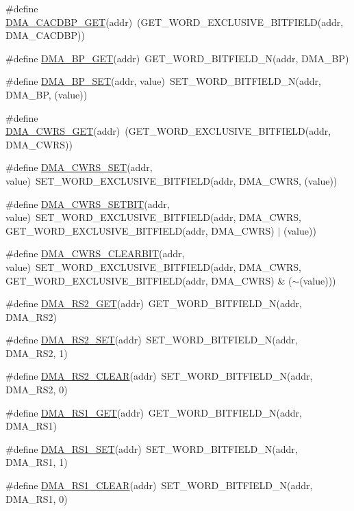 \begin{DoxyCompactItemize}
\#define \hyperlink{a00548_a85feec50364f750c4544956b6958073d}{DMA\_\-CACDBP\_\-GET}(addr)~(GET\_\-WORD\_\-EXCLUSIVE\_\-BITFIELD(addr, DMA\_\-CACDBP))
\item 
\#define \hyperlink{a00548_a220b0aabe103f3c9f9b391748a2f8770}{DMA\_\-BP\_\-GET}(addr)~GET\_\-WORD\_\-BITFIELD\_\-N(addr, DMA\_\-BP)
\item 
\#define \hyperlink{a00548_ac3ec9d44e2d1359fc7e25a35b9ccc60d}{DMA\_\-BP\_\-SET}(addr, value)~SET\_\-WORD\_\-BITFIELD\_\-N(addr, DMA\_\-BP, (value))
\item 
\#define \hyperlink{a00548_aa1af6663d5da77c5b8c5075ef603cf6e}{DMA\_\-CWRS\_\-GET}(addr)~(GET\_\-WORD\_\-EXCLUSIVE\_\-BITFIELD(addr, DMA\_\-CWRS))
\item 
\#define \hyperlink{a00548_a131e5865c587b465550343b69eeaabd5}{DMA\_\-CWRS\_\-SET}(addr, value)~SET\_\-WORD\_\-EXCLUSIVE\_\-BITFIELD(addr, DMA\_\-CWRS, (value))
\item 
\#define \hyperlink{a00548_a122f3d891cc104f1f3572648359c4637}{DMA\_\-CWRS\_\-SETBIT}(addr, value)~SET\_\-WORD\_\-EXCLUSIVE\_\-BITFIELD(addr, DMA\_\-CWRS, GET\_\-WORD\_\-EXCLUSIVE\_\-BITFIELD(addr, DMA\_\-CWRS) $|$ (value))
\item 
\#define \hyperlink{a00548_abfa6eead7bfc7a1844e6d3518c48dac8}{DMA\_\-CWRS\_\-CLEARBIT}(addr, value)~SET\_\-WORD\_\-EXCLUSIVE\_\-BITFIELD(addr, DMA\_\-CWRS, GET\_\-WORD\_\-EXCLUSIVE\_\-BITFIELD(addr, DMA\_\-CWRS) \& ($\sim$(value)))
\item 
\#define \hyperlink{a00548_a80c2ed408c1d84abcc8cd48b1ea47a76}{DMA\_\-RS2\_\-GET}(addr)~GET\_\-WORD\_\-BITFIELD\_\-N(addr, DMA\_\-RS2)
\item 
\#define \hyperlink{a00548_a3c74db6964b09cf9d719e23e0b6f418d}{DMA\_\-RS2\_\-SET}(addr)~SET\_\-WORD\_\-BITFIELD\_\-N(addr, DMA\_\-RS2, 1)
\item 
\#define \hyperlink{a00548_a56cf33a3ff47843e93b59f3c9215c190}{DMA\_\-RS2\_\-CLEAR}(addr)~SET\_\-WORD\_\-BITFIELD\_\-N(addr, DMA\_\-RS2, 0)
\item 
\#define \hyperlink{a00548_a243abce1dd03462aa4c984c6b6aed39a}{DMA\_\-RS1\_\-GET}(addr)~GET\_\-WORD\_\-BITFIELD\_\-N(addr, DMA\_\-RS1)
\item 
\#define \hyperlink{a00548_a58d011526951b33ac0311ea6a8840a17}{DMA\_\-RS1\_\-SET}(addr)~SET\_\-WORD\_\-BITFIELD\_\-N(addr, DMA\_\-RS1, 1)
\item 
\#define \hyperlink{a00548_a21294fb718648778a6767230ceaad1d9}{DMA\_\-RS1\_\-CLEAR}(addr)~SET\_\-WORD\_\-BITFIELD\_\-N(addr, DMA\_\-RS1, 0)
\item 

\end{DoxyCompactItemize}
